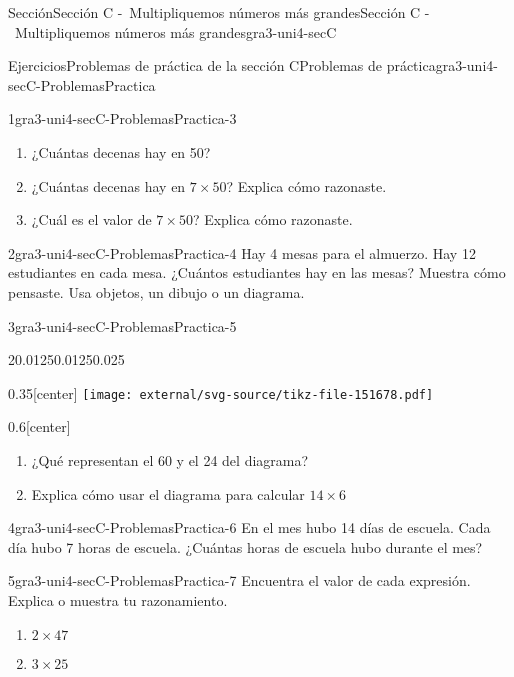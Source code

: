 \documentclass[twoside,10pt,]{article}
\begin{document}
\begin{sectionptx}{Sección}{Sección C -~Multipliquemos números más grandes}{}{Sección C -~Multipliquemos números más grandes}{}{}{gra3-uni4-secC}
\begin{exercises-subsection}{Ejercicios}{Problemas de práctica de la sección C}{}{Problemas de práctica}{}{}{gra3-uni4-secC-ProblemasPractica}
\begin{divisionexercise}{1}{}{}{gra3-uni4-secC-ProblemasPractica-3}
%
\begin{enumerate}[label=(\alph*)]
\item{}¿Cuántas decenas hay en 50?%
\item{}¿Cuántas decenas hay en \(7 \times 50\)? Explica cómo razonaste.%
\item{}¿Cuál es el valor de \(7 \times 50\)? Explica cómo razonaste.%
\end{enumerate}
\end{divisionexercise}%
\begin{divisionexercise}{2}{}{}{gra3-uni4-secC-ProblemasPractica-4}%
Hay 4 mesas para el almuerzo. Hay 12 estudiantes en cada mesa. ¿Cuántos estudiantes hay en las mesas? Muestra cómo pensaste. Usa objetos, un dibujo o un diagrama.%
\end{divisionexercise}%
\begin{divisionexercise}{3}{}{}{gra3-uni4-secC-ProblemasPractica-5}%
\begin{sidebyside}{2}{0.0125}{0.0125}{0.025}%
\begin{sbspanel}{0.35}[center]%
\texttt{[image: external/svg-source/tikz-file-151678.pdf]}
\end{sbspanel}%
\begin{sbspanel}{0.6}[center]%
%
\begin{enumerate}[label=(\alph*)]
\item{}¿Qué representan el 60 y el 24 del diagrama?%
\item{}Explica cómo usar el diagrama para calcular \(14 \times 6\)%
\end{enumerate}
\end{sbspanel}%
\end{sidebyside}%
\end{divisionexercise}%
\begin{divisionexercise}{4}{}{}{gra3-uni4-secC-ProblemasPractica-6}%
En el mes hubo 14 días de escuela. Cada día hubo 7 horas de escuela. ¿Cuántas horas de escuela hubo durante el mes?%
\end{divisionexercise}%
\begin{divisionexercise}{5}{}{}{gra3-uni4-secC-ProblemasPractica-7}%
Encuentra el valor de cada expresión. Explica o muestra tu razonamiento.%
%
\begin{enumerate}[label=(\alph*)]
\item{}\(\displaystyle 2 \times 47\)%
\item{}\(\displaystyle 3 \times 25\)%
\end{enumerate}
\end{divisionexercise}%

\end{exercises-subsection}
\end{sectionptx}
\end{document}
